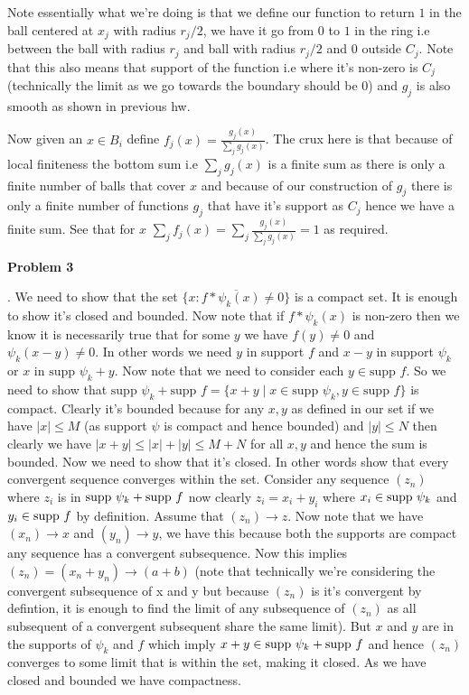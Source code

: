 \documentclass[a4paper]{article}
\begin{document}
Note essentially what we're doing is that we define our function to return $1$ in the ball centered at $x_j$ with radius  $r_j / 2$, we have it go from $0$ to $1$ in the ring i.e between the ball with radius $r_j$ and ball with radius $r_j / 2$ and $0$ outside $C_j$. Note that this also means that support of the function i.e where it's non-zero is $C_j$ (technically the limit as we go towards the boundary should be 0) and $g_j$ is also smooth as shown in previous hw.


\vspace{1em}

Now given an $x \in B_i$ define $f_j(x) = \frac{ g_j(x)}{\sum_j g_j(x)}$. The crux here is that because of local finiteness the bottom sum i.e $\sum_j g_j(x)$ is a finite sum as there is only a finite number of balls that cover $x$ and because of our construction of $g_j$ there is only a finite number of functions $g_j$ that have it's support as $C_j$ hence we have a finite sum. See that for $x$ $\sum_j f_j(x) = \sum_j  \frac{ g_j(x)}{\sum_j g_j(x)} = 1$ as required.


\vspace{1em}

\textbf{Problem 3}

. We need to show that the set  $\overline{\{x : f  * \psi_{k}(x) \ne 0\}}$ is a compact set. It is enough to show it's closed and bounded. Now note that if $f * \psi_k(x)$ is non-zero then we know it is necessarily true that for some $y$ we have $f(y) \ne 0$ and $\psi_k(x - y) \ne 0$. In other words we need $y$ in support $f$ and $x - y$ in support $\psi_k$ or $x$ in $\text{supp } \psi_k + y$. Now note that we need to consider each $y \in \text{supp } f$. So we need to show that $\text{supp }\psi_k + \text{supp }f = \{x + y \mid x \in \text{supp }\psi_k, y \in \text{supp } f\}$ is compact. Clearly it's bounded because for any $x, y$ as defined in our set if we have $|x| \le M$ (as support $\psi$ is compact and hence bounded) and $|y| \le N$ then clearly we have $|x + y| \le |x| + |y| \le M + N$ for all $x,y$ and hence the sum is bounded. Now we  need to show that it's closed. In other words show that every convergent sequence converges within the set. Consider any sequence $(z_n)$ where $z_i$ is in $\text{supp } \psi_k + \text{supp } f$ now clearly $z_i = x_i + y_i$ where $x_i \in \text{supp } \psi_k$ and $y_i \in \text{supp } f$ by definition. Assume that $(z_n) \to z$. Now note that we have $(x_n) \to x$ and $(y_n) \to y$, we have this because both the supports are compact any sequence has a convergent subsequence. Now this implies $(z_n) = (x_n + y_n) \to (a + b)$ (note that technically we're considering the convergent subsequence of x and y but because $(z_n)$ is it's convergent by defintion, it is enough to find the limit of any subsequence of $(z_n)$ as all subsequent of a convergent subsequent share the same limit). But $x$ and $y$ are in the supports of $\psi_k$ and $f$ which imply $x + y \in \text{supp } \psi_k + \text{supp } f$ and hence $(z_n) $ converges to some limit that is within the set, making it closed. As we have closed and bounded we have compactness.
\end{document}
